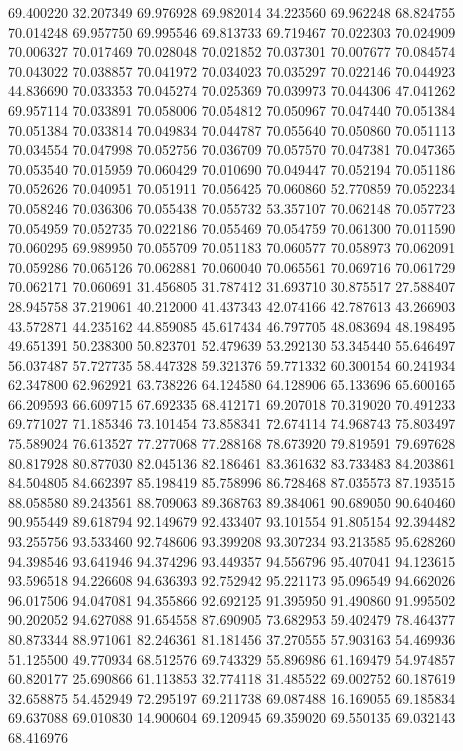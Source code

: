 69.400220
32.207349
69.976928
69.982014
34.223560
69.962248
68.824755
70.014248
69.957750
69.995546
69.813733
69.719467
70.022303
70.024909
70.006327
70.017469
70.028048
70.021852
70.037301
70.007677
70.084574
70.043022
70.038857
70.041972
70.034023
70.035297
70.022146
70.044923
44.836690
70.033353
70.045274
70.025369
70.039973
70.044306
47.041262
69.957114
70.033891
70.058006
70.054812
70.050967
70.047440
70.051384
70.051384
70.033814
70.049834
70.044787
70.055640
70.050860
70.051113
70.034554
70.047998
70.052756
70.036709
70.057570
70.047381
70.047365
70.053540
70.015959
70.060429
70.010690
70.049447
70.052194
70.051186
70.052626
70.040951
70.051911
70.056425
70.060860
52.770859
70.052234
70.058246
70.036306
70.055438
70.055732
53.357107
70.062148
70.057723
70.054959
70.052735
70.022186
70.055469
70.054759
70.061300
70.011590
70.060295
69.989950
70.055709
70.051183
70.060577
70.058973
70.062091
70.059286
70.065126
70.062881
70.060040
70.065561
70.069716
70.061729
70.062171
70.060691
31.456805
31.787412
31.693710
30.875517
27.588407
28.945758
37.219061
40.212000
41.437343
42.074166
42.787613
43.266903
43.572871
44.235162
44.859085
45.617434
46.797705
48.083694
48.198495
49.651391
50.238300
50.823701
52.479639
53.292130
53.345440
55.646497
56.037487
57.727735
58.447328
59.321376
59.771332
60.300154
60.241934
62.347800
62.962921
63.738226
64.124580
64.128906
65.133696
65.600165
66.209593
66.609715
67.692335
68.412171
69.207018
70.319020
70.491233
69.771027
71.185346
73.101454
73.858341
72.674114
74.968743
75.803497
75.589024
76.613527
77.277068
77.288168
78.673920
79.819591
79.697628
80.817928
80.877030
82.045136
82.186461
83.361632
83.733483
84.203861
84.504805
84.662397
85.198419
85.758996
86.728468
87.035573
87.193515
88.058580
89.243561
88.709063
89.368763
89.384061
90.689050
90.640460
90.955449
89.618794
92.149679
92.433407
93.101554
91.805154
92.394482
93.255756
93.533460
92.748606
93.399208
93.307234
93.213585
95.628260
94.398546
93.641946
94.374296
93.449357
94.556796
95.407041
94.123615
93.596518
94.226608
94.636393
92.752942
95.221173
95.096549
94.662026
96.017506
94.047081
94.355866
92.692125
91.395950
91.490860
91.995502
90.202052
94.627088
91.654558
87.690905
73.682953
59.402479
78.464377
80.873344
88.971061
82.246361
81.181456
37.270555
57.903163
54.469936
51.125500
49.770934
68.512576
69.743329
55.896986
61.169479
54.974857
60.820177
25.690866
61.113853
32.774118
31.485522
69.002752
60.187619
32.658875
54.452949
72.295197
69.211738
69.087488
16.169055
69.185834
69.637088
69.010830
14.900604
69.120945
69.359020
69.550135
69.032143
68.416976
